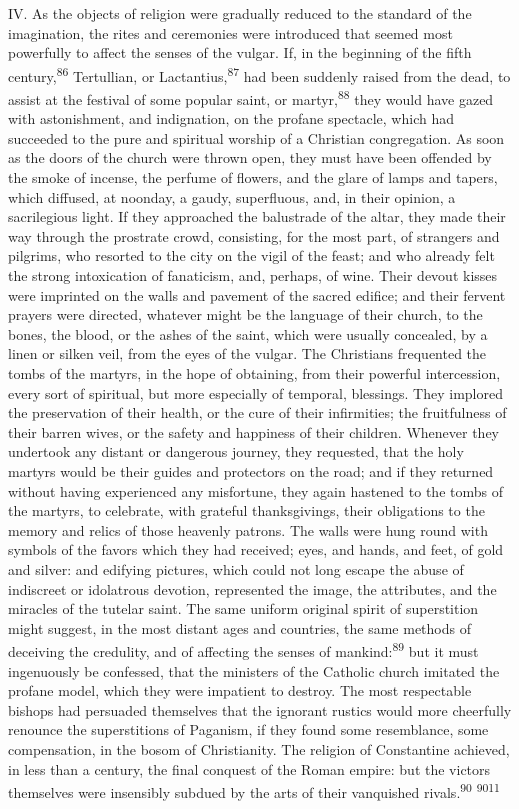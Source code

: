 IV. As the objects of religion were gradually reduced to the
standard of the imagination, the rites and ceremonies were
introduced that seemed most powerfully to affect the senses of
the vulgar. If, in the beginning of the fifth century,\textsuperscript{86}
Tertullian, or Lactantius,\textsuperscript{87} had been suddenly raised from the
dead, to assist at the festival of some popular saint, or martyr,\textsuperscript{88}
they would have gazed with astonishment, and indignation, on
the profane spectacle, which had succeeded to the pure and
spiritual worship of a Christian congregation. As soon as the
doors of the church were thrown open, they must have been
offended by the smoke of incense, the perfume of flowers, and the
glare of lamps and tapers, which diffused, at noonday, a gaudy,
superfluous, and, in their opinion, a sacrilegious light. If they
approached the balustrade of the altar, they made their way
through the prostrate crowd, consisting, for the most part, of
strangers and pilgrims, who resorted to the city on the vigil of
the feast; and who already felt the strong intoxication of
fanaticism, and, perhaps, of wine. Their devout kisses were
imprinted on the walls and pavement of the sacred edifice; and
their fervent prayers were directed, whatever might be the
language of their church, to the bones, the blood, or the ashes
of the saint, which were usually concealed, by a linen or silken
veil, from the eyes of the vulgar. The Christians frequented the
tombs of the martyrs, in the hope of obtaining, from their
powerful intercession, every sort of spiritual, but more
especially of temporal, blessings. They implored the preservation
of their health, or the cure of their infirmities; the
fruitfulness of their barren wives, or the safety and happiness
of their children. Whenever they undertook any distant or
dangerous journey, they requested, that the holy martyrs would be
their guides and protectors on the road; and if they returned
without having experienced any misfortune, they again hastened to
the tombs of the martyrs, to celebrate, with grateful
thanksgivings, their obligations to the memory and relics of
those heavenly patrons. The walls were hung round with symbols of
the favors which they had received; eyes, and hands, and feet, of
gold and silver: and edifying pictures, which could not long
escape the abuse of indiscreet or idolatrous devotion,
represented the image, the attributes, and the miracles of the
tutelar saint. The same uniform original spirit of superstition
might suggest, in the most distant ages and countries, the same
methods of deceiving the credulity, and of affecting the senses
of mankind:\textsuperscript{89} but it must ingenuously be confessed, that the
ministers of the Catholic church imitated the profane model,
which they were impatient to destroy. The most respectable
bishops had persuaded themselves that the ignorant rustics would
more cheerfully renounce the superstitions of Paganism, if they
found some resemblance, some compensation, in the bosom of
Christianity. The religion of Constantine achieved, in less than
a century, the final conquest of the Roman empire: but the
victors themselves were insensibly subdued by the arts of their
vanquished rivals.\textsuperscript{90} \textsuperscript{9011}

